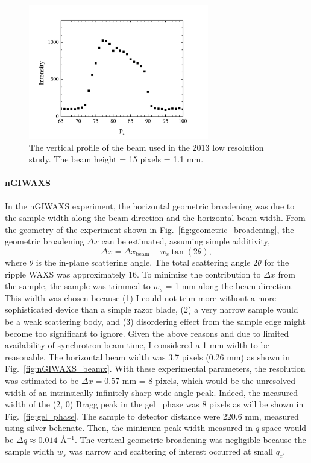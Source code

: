 \begin{figure}[p]
  \centering
  \includegraphics[width=0.7\textwidth]{figures/ripple/MMs/laxs/beamz_lr}
  \caption{The vertical profile of the beam used in the 2013 low resolution study.
  The beam height = 15 pixels = 1.1 mm.}
  \label{fig:ripple_lr_beamz}
\end{figure}

\paragraph{nGIWAXS}
In the nGIWAXS experiment, 
the horizontal geometric broadening was due to the
sample width along the beam direction and the horizontal beam width.
From the geometry of the experiment shown in Fig.~\ref{fig:geometric_broadening}, 
the geometric broadening $\Delta x$ can be estimated,
assuming simple additivity,
\[
\Delta x = \Delta x_\textrm{beam} + w_\textrm{s}\tan(2\theta),
\] 
where $\theta$ is the in-plane scattering angle.
The total scattering angle $2\theta$ for the ripple WAXS was approximately 
16\textdegree. 
To minimize the contribution to $\Delta x$ from the sample, 
the sample was trimmed to $w_s$ = 1 mm along the beam direction. 
This width was chosen because (1) I could not trim more
without a more sophisticated device than a simple razor blade, (2) a very
narrow sample would be a weak scattering body, and (3) disordering effect from 
the sample edge might become too significant to ignore. 
Given the above reasons and due to limited availability
of synchrotron beam time, I considered a 1 mm width to be reasonable.
The horizontal beam width was 3.7 pixels (0.26 mm) as shown in
Fig.~\ref{fig:nGIWAXS_beamx}.
With these experimental parameters, 
the resolution was estimated to be $\Delta x = 0.57$ mm = 8 pixels, 
which would be the unresolved width of an intrinsically infinitely sharp 
wide angle peak.
Indeed, the measured width of the (2, 0) Bragg peak in the gel \LbetaI\ phase
was 8 pixels as will be shown in Fig.~\ref{fig:gel_phase}.
The sample to detector distance were 220.6 mm, measured using silver behenate.
Then, the minimum peak width measured in $q$-space would be
$\Delta q \approx 0.014$ \AA$^{-1}$. The vertical geometric broadening 
was negligible because the sample width $w_s$ was narrow and scattering
of interest occurred at small $q_z$.

